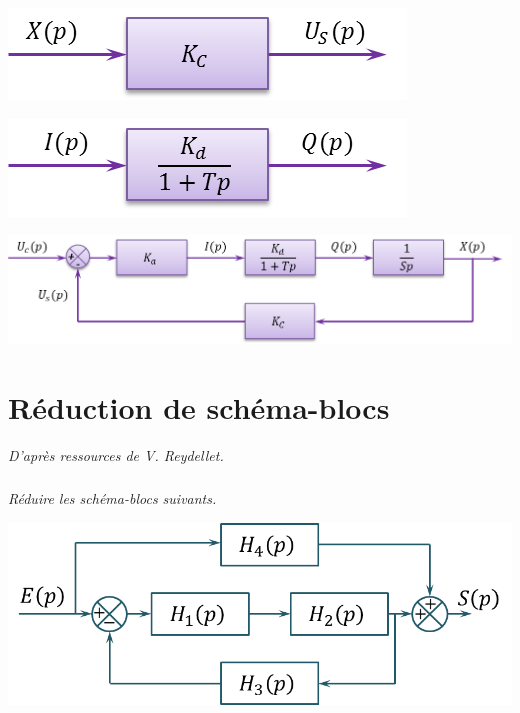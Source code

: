 \documentclass[10pt,fleqn]{article} %
\begin{document}
\begin{multicols}{2}
\begin{corrige}
\begin{minipage}[c]{.23\linewidth}
\begin{center}
\includegraphics[width=.95\textwidth]{images/bloc3}
\end{center}
\end{minipage}\hfill
\begin{minipage}[c]{.23\linewidth}
\begin{center}
\includegraphics[width=.95\textwidth]{images/bloc4}
\end{center}
\end{minipage}



\begin{center}
\includegraphics[width=.8\textwidth]{images/schema_bloc}
\end{center}
\end{corrige}
\else 
\fi




\section*{Réduction de schéma-blocs}
\textit{D'après ressources de V. Reydellet.}
\subparagraph*{}
\textit{Réduire les schéma-blocs suivants.}
\begin{center}
\includegraphics[scale=.2]{images/sb_01}
\end{center}


\end{multicols}
\end{document}
